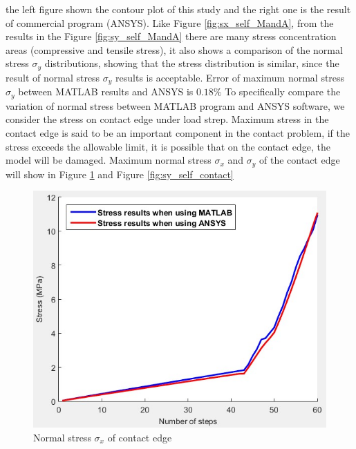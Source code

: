 the left figure shown the contour plot of this study and the right one is the result of commercial
program (ANSYS). Like Figure \ref{fig:sx_self_MandA},
from the results in the Figure \ref{fig:sy_self_MandA} there are many stress concentration areas (compressive and tensile stress),
it also shows a comparison of the normal stress $\sigma_y$ distributions,
showing that the stress distribution is similar,
since the result of normal stress $\sigma_y$ results is acceptable.
Error of maximum normal stress $\sigma_y$ between MATLAB results and ANSYS is $0.18\%$
\vspace{0.38cm} \newline
To specifically compare the variation of normal stress between MATLAB program and ANSYS software,
we consider the stress on contact edge under load strep.
Maximum stress in the contact edge is said to be an important component in the contact problem,
if the stress exceeds the allowable limit,
it is possible that on the contact edge, the model will be damaged.
\vspace{0.38cm} \newline
Maximum normal stress $\sigma_x$ and $\sigma_y$ of the contact edge will show in
Figure \ref{fig:sx_self_contact} and Figure \ref{fig:sy_self_contact}
\vspace{0.38cm}
\begin{figure}[H]
    \centering
    \includegraphics[scale=0.55]{Figures/sx_self_contact.jpg}
    \decoRule
    \caption{Normal stress $\sigma_x$ of contact edge}
    \label{fig:sx_self_contact}
\end{figure} \noindent

